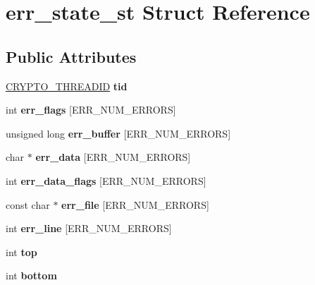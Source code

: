 \hypertarget{structerr__state__st}{}\section{err\+\_\+state\+\_\+st Struct Reference}
\label{structerr__state__st}
\subsection*{Public Attributes}
\begin{DoxyCompactItemize}
\item 
\mbox{\label{structerr__state__st_a9bc9ea657d62cb9d4875cdecb09993b4}} 
\hyperlink{structcrypto__threadid__st}{C\+R\+Y\+P\+T\+O\+\_\+\+T\+H\+R\+E\+A\+D\+ID} {\bfseries tid}
\item 
\mbox{\label{structerr__state__st_ae822060964906dc8a605919d29b20a2c}} 
int {\bfseries err\+\_\+flags} \mbox{[}E\+R\+R\+\_\+\+N\+U\+M\+\_\+\+E\+R\+R\+O\+RS\mbox{]}
\item 
\mbox{\label{structerr__state__st_a6093e57e37a565c5c2ade7453856e0b8}} 
unsigned long {\bfseries err\+\_\+buffer} \mbox{[}E\+R\+R\+\_\+\+N\+U\+M\+\_\+\+E\+R\+R\+O\+RS\mbox{]}
\item 
\mbox{\label{structerr__state__st_a75311ccdf3c5e3ab976b6b134e4ea4de}} 
char $\ast$ {\bfseries err\+\_\+data} \mbox{[}E\+R\+R\+\_\+\+N\+U\+M\+\_\+\+E\+R\+R\+O\+RS\mbox{]}
\item 
\mbox{\label{structerr__state__st_a929c4ef844d860715e5df4935630f23c}} 
int {\bfseries err\+\_\+data\+\_\+flags} \mbox{[}E\+R\+R\+\_\+\+N\+U\+M\+\_\+\+E\+R\+R\+O\+RS\mbox{]}
\item 
\mbox{\label{structerr__state__st_aa8ac00e8b6a07603d015b3e067a764ea}} 
const char $\ast$ {\bfseries err\+\_\+file} \mbox{[}E\+R\+R\+\_\+\+N\+U\+M\+\_\+\+E\+R\+R\+O\+RS\mbox{]}
\item 
\mbox{\label{structerr__state__st_abdfef5b4788717ba882fda5b02c7597c}} 
int {\bfseries err\+\_\+line} \mbox{[}E\+R\+R\+\_\+\+N\+U\+M\+\_\+\+E\+R\+R\+O\+RS\mbox{]}
\item 
\mbox{\label{structerr__state__st_a02b49831a2d90a87b14ae7ad28f0bfb7}} 
int {\bfseries top}
\item 
\mbox{\label{structerr__state__st_a91a24fe0ee64f2618dac094713874c01}} 
int {\bfseries bottom}
\end{DoxyCompactItemize}


